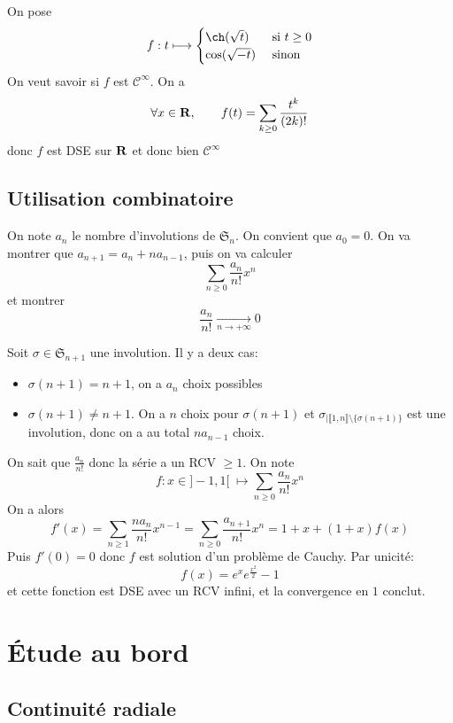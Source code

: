 On pose \[
    f:t\longmapsto \begin{cases}
        \ch(\sqrt t) &\text{ si }t\geq 0 \\
        \cos(\sqrt{-t}) &\text{ sinon }
    \end{cases}
\]
On veut savoir si $f$ est $\mathcal C^\infty$. On a \[
    \forall x\in\mathbf R, \qquad f(t)=\sum_{k\geq 0}\frac{t^k}{(2k)!}
\]
donc $f$ est DSE sur $\mathbf R$ et donc bien $\mathcal C^\infty$

\subsection{Utilisation combinatoire}

On note $a_n$ le nombre d'involutions de $\mathfrak S_n$. On convient que $a_0=0$. On va montrer que $a_{n+1}=a_n+na_{n-1}$, puis on va calculer \[
    \sum_{n\geq 0}\frac{a_n}{n!}x^n
\]
et montrer \[
    \frac{a_n}{n!}\xrightarrow[n\to+\infty]{}0
\]

Soit $\sigma\in\mathfrak S_{n+1}$ une involution. Il y a deux cas: \begin{itemize}
    \item $\sigma(n+1)=n+1$, on a $a_n$ choix possibles
    \item $\sigma(n+1)\neq n+1$. On a $n$ choix pour $\sigma(n+1)$ et $\sigma_{|\llbracket 1, n\rrbracket \setminus\{\sigma(n+1)\}}$ est une involution, donc on a au total $na_{n-1}$ choix.
\end{itemize}

On sait que $\frac{a_n}{n!}$ donc la série a un RCV $\geq 1$. On note \[
    f:x\in ]-1, 1[\;\longmapsto \sum_{n\geq 0}\frac{a_n}{n!}x^n
\]
On a alors \[
    f'(x)=\sum_{n\geq 1}\frac{na_n}{n!}x^{n-1}=\sum_{n\geq 0}\frac{a_{n+1}}{n!}x^n=1+x+(1+x)f(x)
\]
Puis $f'(0)=0$ donc $f$ est solution d'un problème de Cauchy. Par unicité: \[
    f(x)=e^xe^{\frac {x^2}2}-1
\]
et cette fonction est DSE avec un RCV infini, et la convergence en $1$ conclut.

\section{Étude au bord}

\subsection{Continuité radiale}

